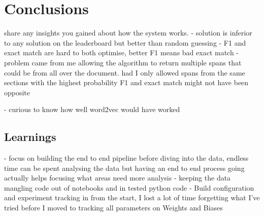 \documentclass[11pt]{article}
\begin{document}
    \section{Conclusions}\label{sec:conclusions}
    share any insights you gained about how the system works.
    - solution is inferior to any solution on the leaderboard but better than random guessing
    - F1 and exact match are hard to both optimise, better F1 means bad exact match
    -   problem came from me allowing the algorithm to return multiple spans that could be from all over the document.
    had I only allowed spans from the same sections with the highest probability F1 and exact match might not have been opposite

    - curious to know how well word2vec would have worked

    \subsection{Learnings}\label{subsec:learnings}
    - focus on building the end to end pipeline before diving into the data, endless time can be spent analysing the data
    but having an end to end process going actually helps focusing what areas need more analysis
    - keeping the data mangling code out of notebooks and in tested python code
    - Build configuration and experiment tracking in from the start, I lost a lot of time forgetting what I've tried before I
    moved to tracking all parameters on Weights and Biases


    
    
\end{document}
